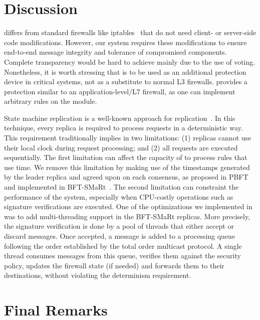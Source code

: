 \section{Discussion}
\label{discussion}

\sieveq differs from standard firewalls like iptables~\cite{iptables} that do not need client- or server-side code modifications.
However, our system requires these modifications to ensure end-to-end message integrity and tolerance of compromised components.
Complete transparency would be hard to achieve mainly due to the use of voting.
Nonetheless, it is worth stressing that \sieveq is to be used as an additional protection device in critical systems, not as a substitute to normal L3 firewalls.
\sieveq provides a protection similar to an application-level/L7 firewall, as one can implement arbitrary rules on the \repsieve module.


State machine replication is a well-known approach for replication~\cite{Schneider:1990}.
In this technique, every replica is required to process requests in a deterministic way.
This requirement traditionally implies in two limitations: (1) replicas cannot use their local clock during request processing; and (2) all requests are executed sequentially.
The first limitation can affect the capacity of \sieveq to process rules that use time.
We remove this limitation by making use of the timestamps generated by the leader replica and agreed upon on each consensus, as proposed in PBFT~\cite{Castro:2002} and implemented in BFT-SMaRt~\cite{Bessani:2014}.
The second limitation can constraint the performance of the system, especially when CPU-costly operations such as signature verifications are executed.
One of the optimizations we implemented in \sieveq was to add multi-threading support in the BFT-SMaRt replicas.
More precisely, the signature verification is done by a pool of threads that either accept or discard messages.
Once accepted, a message is added to a processing queue following the order established by the total order multicast protocol.
A single thread consumes messages from this queue, verifies them against the security policy, updates the firewall state (if needed) and forwards them to their destinations, without violating the determinism requirement.




\section{Final Remarks}
\label{sec:finalremarkssieveq}



